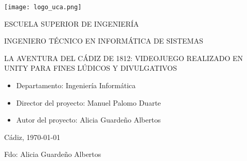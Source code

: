 

\begin{center}

  \texttt{[image: logo\_uca.png]} \\

  \vspace{2.0cm}

  \Large{ESCUELA SUPERIOR DE INGENIERÍA} \\

  \vspace{1.0cm}

  \large{INGENIERO TÉCNICO EN INFORMÁTICA DE SISTEMAS} \\

  \vspace{2.0cm}

  \large{LA AVENTURA DEL CÁDIZ DE 1812: VIDEOJUEGO REALIZADO EN UNITY PARA FINES LÚDICOS Y DIVULGATIVOS} \\

  \vspace{1.0cm}

\end{center}

\begin{itemize}
\item \large{Departamento: Ingeniería Informática}
\item \large{Director del proyecto: Manuel Palomo Duarte}
\item \large{Autor del proyecto: Alicia Guardeño Albertos}
\end{itemize}

\vspace{1.0cm}

\begin{flushright}
  \large{Cádiz, \today} \\

  \vspace{2.5cm}

  \large{Fdo: Alicia Guardeño Albertos}
\end{flushright}
